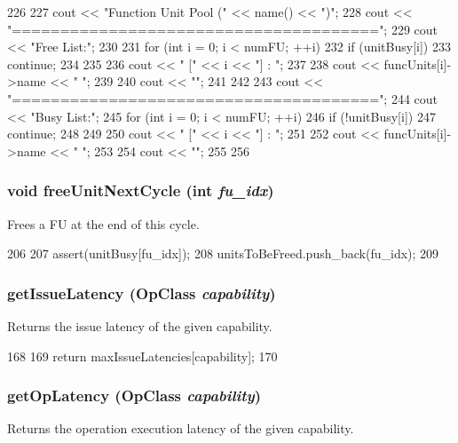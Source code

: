 \begin{DoxyCode}
226 {
227     cout << "Function Unit Pool (" << name() << ")\n";
228     cout << "======================================\n";
229     cout << "Free List:\n";
230 
231     for (int i = 0; i < numFU; ++i) {
232         if (unitBusy[i]) {
233             continue;
234         }
235 
236         cout << "  [" << i << "] : ";
237 
238         cout << funcUnits[i]->name << " ";
239 
240         cout << "\n";
241     }
242 
243     cout << "======================================\n";
244     cout << "Busy List:\n";
245     for (int i = 0; i < numFU; ++i) {
246         if (!unitBusy[i]) {
247             continue;
248         }
249 
250         cout << "  [" << i << "] : ";
251 
252         cout << funcUnits[i]->name << " ";
253 
254         cout << "\n";
255     }
256 }
\end{DoxyCode}
\hypertarget{classFUPool_acc1a8526665e1f0cc2c346754ab30f4f}{
\subsubsection[{freeUnitNextCycle}]{\setlength{\rightskip}{0pt plus 5cm}void freeUnitNextCycle (int {\em fu\_\-idx})}}
\label{classFUPool_acc1a8526665e1f0cc2c346754ab30f4f}
Frees a FU at the end of this cycle. 


\begin{DoxyCode}
206 {
207     assert(unitBusy[fu_idx]);
208     unitsToBeFreed.push_back(fu_idx);
209 }
\end{DoxyCode}
\hypertarget{classFUPool_a99e4f990eca3fd57c7728cfdb6c95b4c}{
\subsubsection[{getIssueLatency}]{ getIssueLatency (OpClass {\em capability})}}
\label{classFUPool_a99e4f990eca3fd57c7728cfdb6c95b4c}
Returns the issue latency of the given capability. 


\begin{DoxyCode}
168                                                {
169         return maxIssueLatencies[capability];
170     }
\end{DoxyCode}
\hypertarget{classFUPool_af6d130ca8a17818dbea697b65927e9ec}{
\subsubsection[{getOpLatency}]{ getOpLatency (OpClass {\em capability})}}
\label{classFUPool_af6d130ca8a17818dbea697b65927e9ec}
Returns the operation execution latency of the given capability. 


